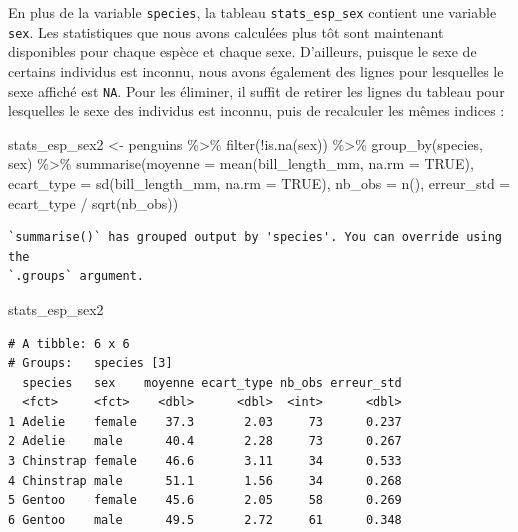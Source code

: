 \documentclass[
  a4paper,
  DIV=11,
  numbers=noendperiod,
  oneside]{scrreprt}
\newenvironment{Shaded}{}{}
\newcommand{\AttributeTok}[1]{\textcolor[rgb]{0.84,0.23,0.29}{#1}}
\newcommand{\ConstantTok}[1]{\textcolor[rgb]{0.00,0.36,0.77}{#1}}
\newcommand{\FunctionTok}[1]{\textcolor[rgb]{0.44,0.26,0.76}{#1}}
\newcommand{\NormalTok}[1]{\textcolor[rgb]{0.14,0.16,0.18}{#1}}
\newcommand{\OtherTok}[1]{\textcolor[rgb]{0.44,0.26,0.76}{#1}}
\newcommand{\SpecialCharTok}[1]{\textcolor[rgb]{0.00,0.36,0.77}{#1}}
\begin{document}
En plus de la variable \texttt{species}, la tableau
\texttt{stats\_esp\_sex} contient une variable \texttt{sex}. Les
statistiques que nous avons calculées plus tôt sont maintenant
disponibles pour chaque espèce et chaque sexe. D'ailleurs, puisque le
sexe de certains individus est inconnu, nous avons également des lignes
pour lesquelles le sexe affiché est \texttt{NA}. Pour les éliminer, il
suffit de retirer les lignes du tableau pour lesquelles le sexe des
individus est inconnu, puis de recalculer les mêmes indices :

\begin{Shaded}
\begin{Highlighting}[]
\NormalTok{stats\_esp\_sex2 }\OtherTok{\textless{}{-}}\NormalTok{ penguins }\SpecialCharTok{\%\textgreater{}\%}
  \FunctionTok{filter}\NormalTok{(}\SpecialCharTok{!}\FunctionTok{is.na}\NormalTok{(sex)) }\SpecialCharTok{\%\textgreater{}\%} 
  \FunctionTok{group\_by}\NormalTok{(species, sex) }\SpecialCharTok{\%\textgreater{}\%}
  \FunctionTok{summarise}\NormalTok{(}\AttributeTok{moyenne =} \FunctionTok{mean}\NormalTok{(bill\_length\_mm, }\AttributeTok{na.rm =} \ConstantTok{TRUE}\NormalTok{),}
            \AttributeTok{ecart\_type =} \FunctionTok{sd}\NormalTok{(bill\_length\_mm, }\AttributeTok{na.rm =} \ConstantTok{TRUE}\NormalTok{),}
            \AttributeTok{nb\_obs =} \FunctionTok{n}\NormalTok{(),}
            \AttributeTok{erreur\_std =}\NormalTok{ ecart\_type }\SpecialCharTok{/} \FunctionTok{sqrt}\NormalTok{(nb\_obs))}
\end{Highlighting}
\end{Shaded}

\begin{verbatim}
`summarise()` has grouped output by 'species'. You can override using the
`.groups` argument.
\end{verbatim}

\begin{Shaded}
\begin{Highlighting}[]
\NormalTok{stats\_esp\_sex2}
\end{Highlighting}
\end{Shaded}

\begin{verbatim}
# A tibble: 6 x 6
# Groups:   species [3]
  species   sex    moyenne ecart_type nb_obs erreur_std
  <fct>     <fct>    <dbl>      <dbl>  <int>      <dbl>
1 Adelie    female    37.3       2.03     73      0.237
2 Adelie    male      40.4       2.28     73      0.267
3 Chinstrap female    46.6       3.11     34      0.533
4 Chinstrap male      51.1       1.56     34      0.268
5 Gentoo    female    45.6       2.05     58      0.269
6 Gentoo    male      49.5       2.72     61      0.348
\end{verbatim}
\end{document}

